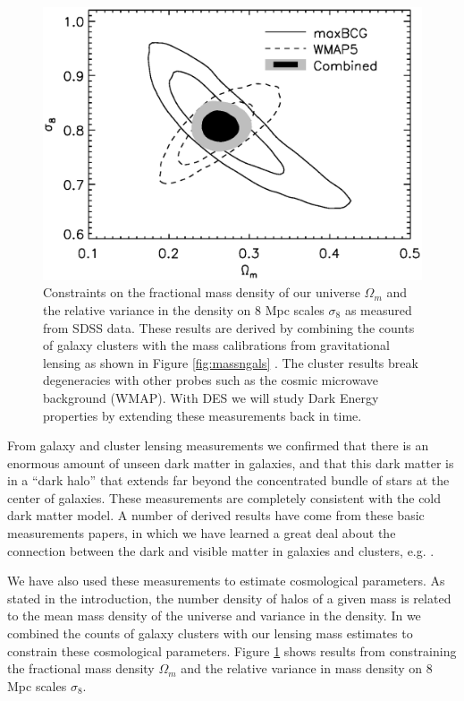 \documentclass[12pt]{article}
\begin{document}
\begin{figure}[p] 
\centering 
\includegraphics[scale=0.6]{s8_Om.ps}

\caption{Constraints on the fractional mass density of our universe $\Omega_m$
and the relative variance in the density on 8 Mpc scales $\sigma_8$ as measured
from SDSS data.  These results \cite{RozoCosmo09} are derived by combining the
counts of galaxy clusters with the mass calibrations from gravitational lensing
as shown in Figure \ref{fig:massngals}
\cite{SheldonLensing07,JohnstonLensing07}.  The cluster results break
degeneracies with other probes such as the cosmic microwave background (WMAP).
With DES we will study Dark Energy properties by extending these measurements
back in time.  \label{fig:omegasigma8}} \end{figure}



From galaxy and cluster lensing measurements we confirmed that there is an
enormous amount of unseen dark matter in galaxies, and that this dark matter is
in a ``dark halo'' that extends far beyond the concentrated bundle of stars at
the center of galaxies.  These measurements are completely consistent with the
cold dark matter model.  A number of derived results have come from these basic
measurements papers, in which we have learned a great deal about the connection
between the dark and visible matter in galaxies and clusters, e.g.
\cite{RykoffLXM08,RozoScatter09}. 

We have also used these measurements to estimate cosmological parameters.  As
stated in the introduction, the number density of halos of a given mass is
related to the mean mass density of the universe and variance in the 
density.  In \cite{RozoCosmo09} we combined the counts of galaxy clusters with
our lensing mass estimates to constrain these cosmological parameters.  Figure
\ref{fig:omegasigma8} shows results from \cite{RozoCosmo09} constraining the
fractional mass density $\Omega_m$ and the relative variance in mass density on
8 Mpc scales $\sigma_8$.
\end{document}
